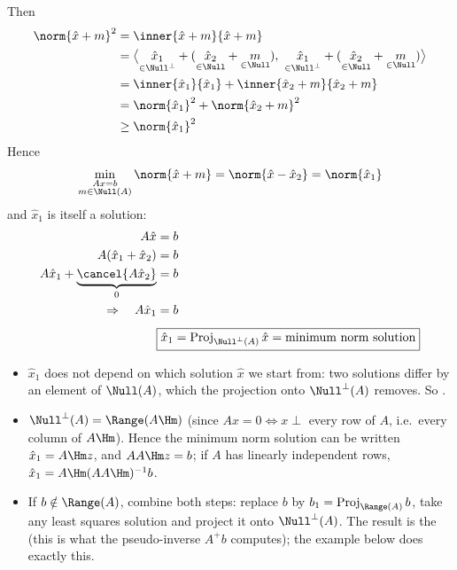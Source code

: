 Then
\begin{align*}
\norm{\hat x + m}^2 &= \inner{\hat x + m}{\hat x + m}\\
&= \big\langle \underset{\in\Null^\perp}{\hat x_1} + (\underset{\in\Null}{\hat x_2} + \underset{\in\Null}{m}),\ \underset{\in\Null^\perp}{\hat x_1} + (\underset{\in\Null}{\hat x_2} + \underset{\in\Null}{m})\big\rangle\\
&= \inner{\hat x_1}{\hat x_1} + \inner{\hat x_2 + m}{\hat x_2 + m}\\
&= \norm{\hat x_1}^2 + \norm{\hat x_2 + m}^2\\
&\geq \norm{\hat x_1}^2
\end{align*}
Hence
\begin{gather*}
\min_{\substack{Ax=b\\ m\in\Null(A)}} \norm{\hat x + m} = \norm{\hat x - \hat x_2} = \norm{\hat x_1}
\end{gather*}
and $\hat x_1$ is itself a solution:
\begin{align*}
A\hat x &= b\\
A(\hat x_1 + \hat x_2) &= b\\
A\hat x_1 + \underbrace{\cancel{A\hat x_2}}_{0} &= b\\
\Rightarrow\quad A\hat x_1 &= b\\[4pt]
&\boxed{\hat x_1 = \operatorname{Proj}_{\Null^\perp(A)}\hat x = \text{minimum norm solution}}
\end{align*}
\begin{insight}
\begin{itemize}[nosep]
  \item $\hat x_1$ does not depend on which solution $\hat x$ we start from: two solutions differ by an element
        of $\Null(A)$, which the projection onto $\Null^\perp(A)$ removes. So .
  \item $\Null^\perp(A) = \Range(A\Hm)$ (since $Ax=0 \iff x\perp$ every row of $A$, i.e.\ every column of $A\Hm$).
        Hence the minimum norm solution can be written $\hat x_1 = A\Hm z$, and $AA\Hm z = b$; if $A$ has
        linearly independent rows, $\hat x_1 = A\Hm(AA\Hm)^{-1}b$.
  \item If $b\notin\Range(A)$, combine both steps: replace $b$ by $b_1 = \operatorname{Proj}_{\Range(A)}b$, take any
        least squares solution and project it onto $\Null^\perp(A)$. The result is the  (this is what the pseudo-inverse $A^{+}b$ computes); the example below does exactly this.
\end{itemize}
\end{insight}

